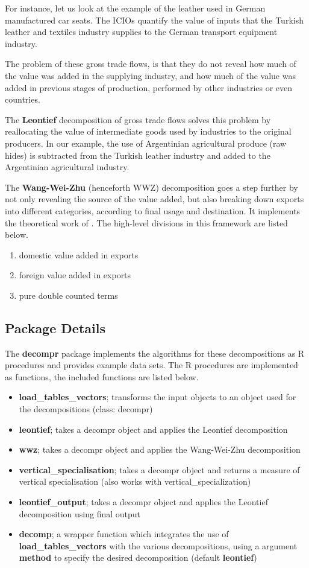 \documentclass[a4paper]{article}\usepackage[]{graphicx}\usepackage[]{color}
\begin{document}
For instance, let us look at the example of the leather used in German manufactured car seats.
The ICIOs quantify the value of inputs that the Turkish leather and textiles industry
supplies to the German transport equipment industry.

The problem of these gross trade flows, is that they do not reveal how much of the value was added in the supplying industry,
and how much of the value was added in previous stages of production, performed by other industries or even countries.

The \textbf{Leontief} decomposition of gross trade flows solves this problem by reallocating the value of intermediate goods used by industries to the original producers.
In our example, the use of Argentinian agricultural produce (raw hides) is subtracted from the Turkish leather industry and added to the Argentinian agricultural industry.

The \textbf{Wang-Wei-Zhu} (henceforth WWZ) decomposition goes a step further by not only revealing the source of the value added, but also breaking down exports into different categories, according to final usage and destination.
It implements the theoretical work of \textcite{wang2014quantifying}.
The high-level divisions in this framework are listed below.

\begin{enumerate}
 \item domestic value added in exports
 \item foreign value added in exports
 \item pure double counted terms
\end{enumerate}

\subsection{Package Details}
The \textbf{decompr} package implements the algorithms for these decompositions as R procedures and provides example data sets.
The R procedures are implemented as functions, the included functions are listed below.

\begin{itemize}
 \item \textbf{load\_tables\_vectors}; transforms the input objects to an object used for the decompositions (class: decompr)
 \item \textbf{leontief}; takes a decompr object and applies the Leontief decomposition
 \item \textbf{wwz}; takes a decompr object and applies the Wang-Wei-Zhu decomposition
 \item \textbf{vertical\_specialisation}; takes a decompr object and returns a measure of vertical specialisation (also works with vertical\_specialization)
 \item \textbf{leontief\_output}; takes a decompr object and applies the Leontief decomposition using final output
 \item \textbf{decomp}; a wrapper function which integrates the use of \textbf{load\_tables\_vectors} with the various decompositions, using a argument \textbf{method} to specify the desired decomposition (default \textbf{leontief}) 
\end{itemize}
\end{document}
